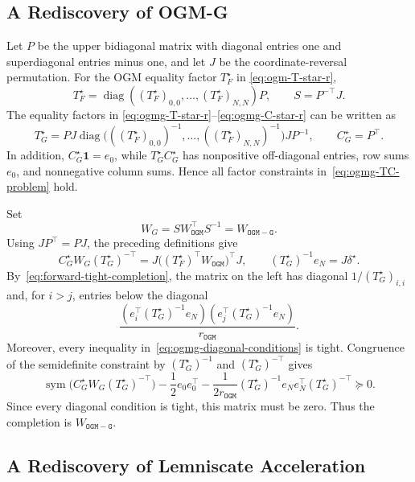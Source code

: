 \documentclass[11pt]{article}
\newcommand{\one}{\mathbf 1}
\begin{document}
\subsection{A Rediscovery of OGM-G} \label{subsec:discovering-ogmg}

Let $P$ be the upper bidiagonal matrix with diagonal entries one and
superdiagonal entries minus one, and let $J$ be the coordinate-reversal
permutation. For the OGM equality factor $T_F^\star$ in
\eqref{eq:ogm-T-star-r},
\[
T_F^\star=\operatorname{diag}((T_F^\star)_{0,0},\ldots,(T_F^\star)_{N,N})P,
\qquad
S=P^{-\top}J.
\]
The equality factors in
\eqref{eq:ogmg-T-star-r}--\eqref{eq:ogmg-C-star-r} can be written as
\[
T_G^\star
=PJ\operatorname{diag}\bigl(((T_F^\star)_{0,0})^{-1},\ldots,
((T_F^\star)_{N,N})^{-1}\bigr)JP^{-1},
\qquad
C_G^\star=P^\top.
\]
In addition, $C_G^\star\one=e_0$, while $T_G^\star C_G^\star$ has
nonpositive off-diagonal entries, row sums $e_0$, and nonnegative column
sums. Hence all factor constraints in~\eqref{eq:ogmg-TC-problem} hold.

Set
\[
W_G=SW_\mathtt{OGM}^\top S^{-1}=W_\mathtt{OGM-G}.
\]
Using $JP^\top=PJ$, the preceding definitions give
\[
C_G^\star W_G(T_G^\star)^{-\top}
=J\bigl((T_F^\star)^\top W_\mathtt{OGM}\bigr)^\top J,
\qquad
(T_G^\star)^{-1}e_N=J\delta^\star.
\]
By~\eqref{eq:forward-tight-completion}, the matrix on the left has diagonal
$1/(T_G^\star)_{i,i}$ and, for $i>j$, entries below the diagonal
\[
\frac{(e_i^\top(T_G^\star)^{-1}e_N)
(e_j^\top(T_G^\star)^{-1}e_N)}{r_\mathtt{OGM}}.
\]
Moreover, every inequality in~\eqref{eq:ogmg-diagonal-conditions} is tight. Congruence of the semidefinite constraint by
$(T_G^\star)^{-1}$ and $(T_G^\star)^{-\top}$ gives
\[
\operatorname{sym}\bigl(C_G^\star W_G(T_G^\star)^{-\top}\bigr)
-\frac12e_0e_0^\top
-\frac1{2r_\mathtt{OGM}}
 (T_G^\star)^{-1}e_Ne_N^\top(T_G^\star)^{-\top}
\succeq0.
\]
Since every diagonal condition is tight, this matrix must be zero. Thus the completion is
$W_\mathtt{OGM-G}$.

\subsection{A Rediscovery of Lemniscate Acceleration} \label{subsec:discovering-lemni}
\end{document}
